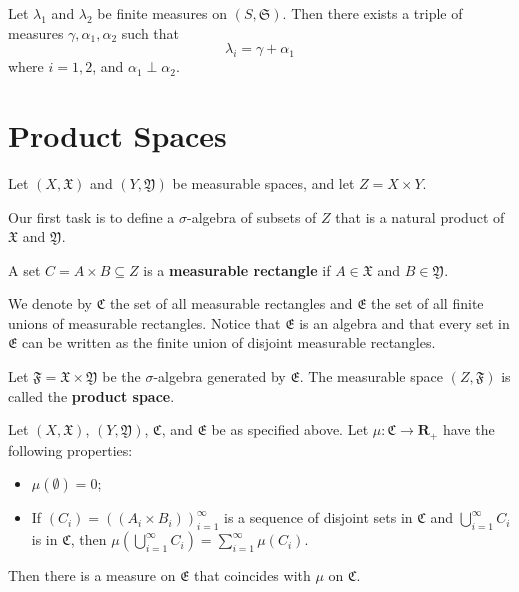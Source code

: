 \begin{lemma}
	Let $\lambda_1$ and $\lambda_2$ be finite measures on $(S, \mathfrak{S})$. Then there exists a triple of measures $\gamma, \alpha_1, \alpha_2$ such that
	\[
		\lambda_i = \gamma + \alpha_1
	\]
	where $i = 1, 2$, and $\alpha_1 \perp \alpha_2$.
\end{lemma}

\section{Product Spaces}

Let $(X, \mathfrak{X})$ and $(Y, \mathfrak{Y})$ be measurable spaces, and let $Z = X \times Y$.

Our first task is to define a $\sigma$-algebra of subsets of $Z$ that is a natural product of $\mathfrak{X}$ and $\mathfrak{Y}$.

\begin{definition}
	A set $C = A \times B \subseteq Z$ is a \textbf{measurable rectangle} if $A \in \mathfrak{X}$ and $B \in \mathfrak{Y}$.
\end{definition}

We denote by $\mathfrak{C}$ the set of all measurable rectangles and $\mathfrak{E}$ the set of all finite unions of measurable rectangles. Notice that $\mathfrak{E}$ is an algebra and that every set in $\mathfrak{E}$ can be written as the finite union of disjoint measurable rectangles.

\begin{definition}
	Let $\mathfrak{F} = \mathfrak{X} \times \mathfrak{Y}$ be the $\sigma$-algebra generated by $\mathfrak{E}$. The measurable space $(Z, \mathfrak{F})$ is called the \textbf{product space}.
\end{definition}

\begin{theorem}
	Let $(X, \mathfrak{X})$, $(Y, \mathfrak{Y})$, $\mathfrak{C}$, and $\mathfrak{E}$ be as specified above. Let $\mu : \mathfrak{C} \longrightarrow \textbf{R}_+$ have the following properties:
	\begin{itemize}
		\item $\mu(\emptyset) = 0$;
  		\item  If $(C_i) = ((A_i \times B_i))_{i=1}^\infty$ is a sequence of disjoint sets in $\mathfrak{C}$ and $\bigcup_{i=1}^\infty C_i$ is in $\mathfrak{C}$, then $\mu \left( \bigcup_{i=1}^\infty C_i \right) = \sum_{i=1}^\infty \mu(C_i)$.
	\end{itemize}
	Then there is a measure on $\mathfrak{E}$ that coincides with $\mu$ on $\mathfrak{C}$.
\end{theorem}

